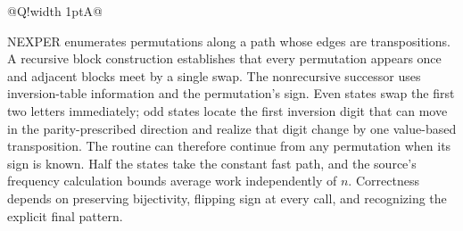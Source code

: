 \documentclass[10pt,letterpaper]{article}
\begin{document}
\begin{longtable}{@{}Q!{\color{Mist}\vrule width 1pt}A@{}}
\end{longtable}
\begin{tcolorbox}[colback=Ink!4,colframe=Ink,title=Cornell summary]
NEXPER enumerates permutations along a path whose edges are transpositions. A recursive block construction establishes that every permutation appears once and adjacent blocks meet by a single swap. The nonrecursive successor uses inversion-table information and the permutation's sign. Even states swap the first two letters immediately; odd states locate the first inversion digit that can move in the parity-prescribed direction and realize that digit change by one value-based transposition. The routine can therefore continue from any permutation when its sign is known. Half the states take the constant fast path, and the source's frequency calculation bounds average work independently of $n$. Correctness depends on preserving bijectivity, flipping sign at every call, and recognizing the explicit final pattern.
\end{tcolorbox}
\end{document}
